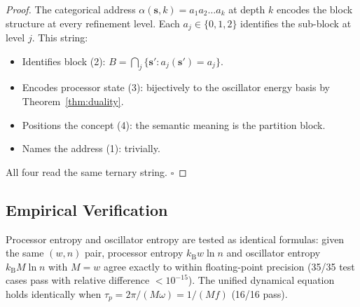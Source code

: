 \documentclass[twocolumn,11pt,a4paper]{article}
\newcommand{\kb}{k_{\mathrm{B}}}
\begin{document}
\begin{proof}
The categorical address $\alpha(\mathbf{s}, k) = a_1 a_2 \ldots a_k$ at depth $k$ encodes the block structure at every refinement level. Each $a_j \in \{0,1,2\}$ identifies the sub-block at level $j$. This string:
\begin{itemize}[leftmargin=*,itemsep=1pt]
\item Identifies block (2): $B = \bigcap_j \{\mathbf{s}' : a_j(\mathbf{s}') = a_j\}$.
\item Encodes processor state (3): bijectively to the oscillator energy basis by Theorem~\ref{thm:duality}.
\item Positions the concept (4): the semantic meaning is the partition block.
\item Names the address (1): trivially.
\end{itemize}
All four read the same ternary string. $\square$
\end{proof}

\subsection{Empirical Verification}

Processor entropy and oscillator entropy are tested as identical formulas: given the same $(w, n)$ pair, processor entropy $\kb w \ln n$ and oscillator entropy $\kb M \ln n$ with $M = w$ agree exactly to within floating-point precision (35/35 test cases pass with relative difference $< 10^{-15}$). The unified dynamical equation holds identically when $\tau_p = 2\pi/(M\omega) = 1/(Mf)$ (16/16 pass).
\end{document}

